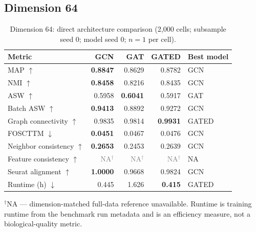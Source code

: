 \documentclass[10pt]{article}
\begin{document}
\subsection{Dimension 64}
\begin{table}[H]
\centering
\small
\caption{Dimension 64: direct architecture comparison (2,000 cells; subsample seed 0; model seed 0; $n=1$ per cell).}
\label{tab:dim64}
\begin{tabular}{@{}lrrrl@{}}
\toprule
Metric & GCN & GAT & GATED & Best model \\
\midrule
MAP $\uparrow$ & \textbf{0.8847} & 0.8629 & 0.8782 & GCN \\
NMI $\uparrow$ & \textbf{0.8458} & 0.8216 & 0.8435 & GCN \\
ASW $\uparrow$ & 0.5958 & \textbf{0.6041} & 0.5917 & GAT \\
Batch ASW $\uparrow$ & \textbf{0.9413} & 0.8892 & 0.9272 & GCN \\
Graph connectivity $\uparrow$ & 0.9835 & 0.9814 & \textbf{0.9931} & GATED \\
FOSCTTM $\downarrow$ & \textbf{0.0451} & 0.0467 & 0.0476 & GCN \\
Neighbor consistency $\uparrow$ & \textbf{0.2653} & 0.2453 & 0.2639 & GCN \\
Feature consistency $\uparrow$ & \textcolor{gray}{NA$^{\dagger}$} & \textcolor{gray}{NA$^{\dagger}$} & \textcolor{gray}{NA$^{\dagger}$} & NA \\
Seurat alignment $\uparrow$ & \textbf{1.0000} & 0.9668 & 0.9824 & GCN \\
Runtime (h) $\downarrow$ & 0.445 & 1.626 & \textbf{0.415} & GATED \\
\bottomrule
\end{tabular}
\begin{minipage}{0.92\linewidth}\footnotesize\vspace{2pt}$^{\dagger}$NA --- dimension-matched full-data reference unavailable. Runtime is training runtime from the benchmark run metadata and is an efficiency measure, not a biological-quality metric.\end{minipage}
\end{table}
\end{document}
